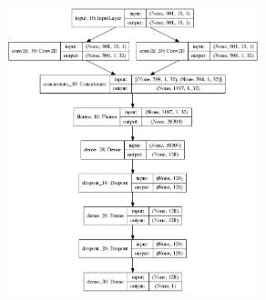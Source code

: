\documentclass[10pt]{beamer}
\begin{document}
\begin{frame}
	\begin{figure}[ht]
		\centering
		\includegraphics[width = 0.65\textwidth]{../../models/plotted_models/DiProDB_model.png}
	\end{figure}
\end{frame}
\end{document}
